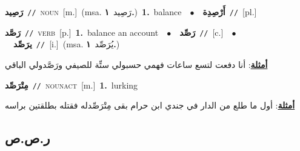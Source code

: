 \documentclass[10pt,a4paper,twoside]{article} %
\begin{document}
\begin{multicols}{2}
{\setlength\topsep{0pt}\textbf{\foreignlanguage{arabic}{رَصِيد}}\ {\color{gray}\texttt{//}\color{black}}\ \textsc{noun}\ [m.]\ \color{gray}(msa. \foreignlanguage{arabic}{رَصِيد}~\foreignlanguage{arabic}{\textbf{١.}})\color{black}\ \textbf{1.}~balance\ \ $\bullet$\ \ \setlength\topsep{0pt}\textbf{\foreignlanguage{arabic}{أَرْصِدِة}}\ {\color{gray}\texttt{//}\color{black}}\ [pl.]\ } \vspace{2mm}

{\setlength\topsep{0pt}\textbf{\foreignlanguage{arabic}{رَصَّد}}\ {\color{gray}\texttt{//}\color{black}}\ \textsc{verb}\ [p.]\ \textbf{1.}~balance an account\ \ $\bullet$\ \ \setlength\topsep{0pt}\textbf{\foreignlanguage{arabic}{رَصِّد}}\ {\color{gray}\texttt{//}\color{black}}\ [c.]\ \ $\bullet$\ \ \setlength\topsep{0pt}\textbf{\foreignlanguage{arabic}{يرَصِّد}}\ {\color{gray}\texttt{//}\color{black}}\ [i.]\ \color{gray}(msa. \foreignlanguage{arabic}{يُرَصِّد}~\foreignlanguage{arabic}{\textbf{١.}})\color{black}\  \begin{flushright}\color{gray}\foreignlanguage{arabic}{\textbf{\underline{\foreignlanguage{arabic}{أمثلة}}}: أنا دفعت لتسع ساعات فهمي حسبولي ستِّة للصيفي ورَصَّدولي الباقي}\end{flushright}\color{black}} \vspace{2mm}

{\setlength\topsep{0pt}\textbf{\foreignlanguage{arabic}{مِتْرَصِّد}}\ {\color{gray}\texttt{//}\color{black}}\ \textsc{noun\textunderscore act}\ [m.]\ \textbf{1.}~lurking\  \begin{flushright}\color{gray}\foreignlanguage{arabic}{\textbf{\underline{\foreignlanguage{arabic}{أمثلة}}}: أول ما طلع من الدار في جندي ابن حرام بقى مِتْرَصِّدله فقتله بطلقتين براسه}\end{flushright}\color{black}} \vspace{2mm}

\vspace{-3mm}
\subsection*{\color{blue}\foreignlanguage{arabic}{ر.ص.ص}\color{blue}{}} 


\end{multicols}
\end{document}
